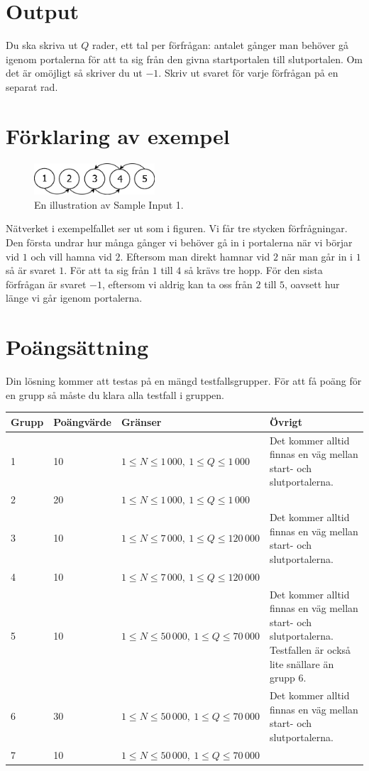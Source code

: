 \section*{Output}
Du ska skriva ut $Q$ rader, ett tal per förfrågan: antalet gånger man behöver gå
igenom portalerna för att ta sig från den givna startportalen till
slutportalen. Om det är omöjligt så skriver du ut $-1$. Skriv ut svaret
för varje förfrågan på en separat rad.

\section*{Förklaring av exempel}

\begin{figure}[ht!]
\centering
\includegraphics[width=0.4\textwidth]{portaler.png}
\caption{En illustration av Sample Input 1.}
\label{overflow}
\end{figure}

Nätverket i exempelfallet ser ut som i figuren. Vi får tre stycken förfrågningar. Den första
undrar hur många gånger vi behöver gå in i portalerna när vi börjar vid $1$ och vill hamna
vid $2$. Eftersom man direkt hamnar vid $2$ när man går in i $1$ så är svaret $1$. För att
ta sig från $1$ till $4$ så krävs tre hopp. För den sista förfrågan är svaret $-1$,
eftersom vi aldrig kan ta oss från $2$ till $5$, oavsett hur länge vi går igenom portalerna.

\section*{Poängsättning}
Din lösning kommer att testas på en mängd testfallsgrupper. För att få poäng för en grupp
så måste du klara alla testfall i gruppen.

\begin{tabular}{| l | l | l | l |}
\hline
Grupp & Poängvärde & Gränser & Övrigt\\ \hline
1     & 10         & $ 1 \le N \le 1\,000,\ 1 \le Q \le 1\,000$ & Det kommer alltid finnas en väg mellan start- och slutportalerna.\\ \hline
2     & 20         & $ 1 \le N \le 1\,000,\ 1 \le Q \le 1\,000$ &  \\ \hline
3     & 10         & $ 1 \le N \le 7\,000,\ 1 \le Q \le 120\,000$ & Det kommer alltid finnas en väg mellan start- och slutportalerna.\\ \hline
4     & 10         & $ 1 \le N \le 7\,000,\ 1 \le Q \le 120\,000$ &  \\ \hline
5     & 10         & $ 1 \le N \le 50\,000,\ 1 \le Q \le 70\,000$ & Det kommer alltid finnas en väg mellan start- och slutportalerna. Testfallen är också lite snällare än grupp 6.\\ \hline
6     & 30         & $ 1 \le N \le 50\,000,\ 1 \le Q \le 70\,000$ & Det kommer alltid finnas en väg mellan start- och slutportalerna. \\ \hline
7     & 10         & $ 1 \le N \le 50\,000,\ 1 \le Q \le 70\,000$ &  \\ \hline
\end{tabular}

